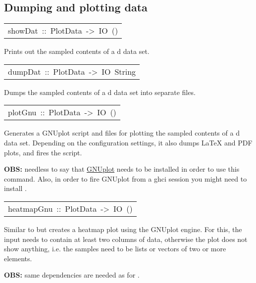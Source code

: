 \subsection{Dumping and plotting data}
\begin{haddockdesc}
\item[\begin{tabular}{@{}l}
showDat\ ::\ PlotData\ ->\ IO\ ()
\end{tabular}]\haddockbegindoc
Prints out the sampled contents of a d data set.\par

\end{haddockdesc}
\begin{haddockdesc}
\item[\begin{tabular}{@{}l}
dumpDat\ ::\ PlotData\ ->\ IO\ {\char 91}String{\char 93}
\end{tabular}]\haddockbegindoc
Dumps the sampled contents of a d data set into separate
  files.\par

\end{haddockdesc}
\begin{haddockdesc}
\item[\begin{tabular}{@{}l}
plotGnu\ ::\ PlotData\ ->\ IO\ ()
\end{tabular}]\haddockbegindoc
Generates a GNUplot script and  files for plotting the
 sampled contents of a d data set. Depending on the
 configuration settings, it also dumps LaTeX and PDF plots, and
 fires the script.\par
\textbf{OBS:} needless to say that \href{http://www.gnuplot.info/}{GNUplot}
 needs to be installed in order to use this command. Also, in order
 to fire GNUplot from a ghci session you might need to install
 .\par

\end{haddockdesc}
\begin{haddockdesc}
\item[\begin{tabular}{@{}l}
heatmapGnu\ ::\ PlotData\ ->\ IO\ ()
\end{tabular}]\haddockbegindoc
Similar to  but creates a heatmap plot using the GNUplot
 engine. For this, the input needs to contain at least two columns
 of data, otherwise the plot does not show anything, i.e. the
 samples need to be lists or vectors of two or more elements.\par
\textbf{OBS:} same dependencies are needed as for .\par

\end{haddockdesc}
